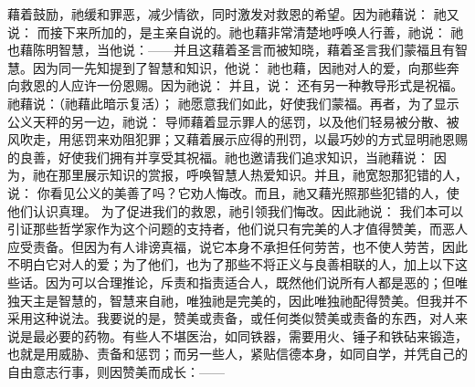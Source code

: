 藉着鼓励，祂缓和罪恶，减少情欲，同时激发对救恩的希望。因为祂藉说： 祂又说： 而接下来所加的，是主亲自说的。祂也藉非常清楚地呼唤人行善，祂说： 祂也藉陈明智慧，当他说：——并且这藉着圣言而被知晓，藉着圣言我们蒙福且有智慧。因为同一先知提到了智慧和知识，他说： 祂也藉，因祂对人的爱，向那些奔向救恩的人应许一份恩赐。因为祂说： 并且，说： 还有另一种教导形式是祝福。祂藉说：（祂藉此暗示复活）； 祂愿意我们如此，好使我们蒙福。再者，为了显示公义天秤的另一边，祂说： 导师藉着显示罪人的惩罚，以及他们轻易被分散、被风吹走，用惩罚来劝阻犯罪；又藉着展示应得的刑罚，以最巧妙的方式显明祂恩赐的良善，好使我们拥有并享受其祝福。祂也邀请我们追求知识，当祂藉说： 因为，祂在那里展示知识的赏报，呼唤智慧人热爱知识。并且，祂宽恕那犯错的人，说： 你看见公义的美善了吗？它劝人悔改。而且，祂又藉光照那些犯错的人，使他们认识真理。 为了促进我们的救恩，祂引领我们悔改。因此祂说： 我们本可以引证那些哲学家作为这个问题的支持者，他们说只有完美的人才值得赞美，而恶人应受责备。但因为有人诽谤真福，说它本身不承担任何劳苦，也不使人劳苦，因此不明白它对人的爱；为了他们，也为了那些不将正义与良善相联的人，加上以下这些话。因为可以合理推论，斥责和指责适合人，既然他们说所有人都是恶的；但唯独天主是智慧的，智慧来自祂，唯独祂是完美的，因此唯独祂配得赞美。但我并不采用这种说法。我要说的是，赞美或责备，或任何类似赞美或责备的东西，对人来说是最必要的药物。有些人不堪医治，如同铁器，需要用火、锤子和铁砧来锻造，也就是用威胁、责备和惩罚；而另一些人，紧贴信德本身，如同自学，并凭自己的自由意志行事，则因赞美而成长：——\par

